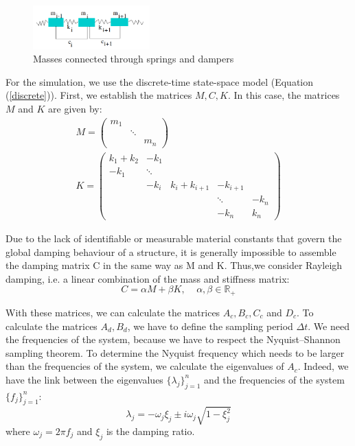 \documentclass[journal]{IEEEtran}
\begin{document}
\begin{figure}[h!]
  \centering
  \includegraphics[width=0.4\textwidth]{images/ressorts.png}
  \caption{Masses connected through springs and dampers}
  \label{springs}
\end{figure}

For the simulation, we use the discrete-time state-space model (Equation (\ref{discrete})). First, we establish the matrices $M, C, K$. In this case, the matrices $M$ and $K$ are given by:
\begin{equation}
\begin{array}{l}
M =
\begin{pmatrix}
m_1\\
&\ddots\\
&&m_n
\end{pmatrix}
\\
K =
\begin{pmatrix}
k_1 + k_2 & - k_1 \\
- k_1 &\ddots\\
& -k_i & k_i + k_{i+1} & -k_{i+1} \\
&&&\ddots& -k_n\\
&&& -k_n & k_n
\end{pmatrix}
\end{array}
\end{equation}


Due to the lack of identifiable or measurable material
constants that govern the global damping behaviour of a structure, it is generally
impossible to assemble the damping matrix C in the same way as M and K.
Thus,we consider Rayleigh damping, i.e. a linear combination of the mass and stiffness matrix:
\begin{equation}
C = \alpha M + \beta K,\ \ \ \ \ \alpha, \beta \in \mathbb{R}_+
\end{equation}

With these matrices, we can calculate the matrices $A_c, B_c, C_c$ and $D_c$. To calculate the matrices $A_d, B_d$, we have to define the
sampling period $\Delta t$. We need the frequencies of the system, because we have to respect the Nyquist–Shannon sampling theorem.
To determine the Nyquist frequency which needs to be larger than the frequencies of the system, we calculate the eigenvalues of $A_c$. Indeed, we have the link between the eigenvalues $\{\lambda_j\}_{j=1}^n$ and the frequencies of the system $\{f_j\}_{j=1}^n$:
\begin{equation}
\lambda_j = - \omega_j \xi_j \pm i \omega_j \sqrt{1 - \xi_j^2}
\end{equation}
where $\omega_j = 2 \pi f_j$ and $\xi_j$ is the damping ratio.
\end{document}
